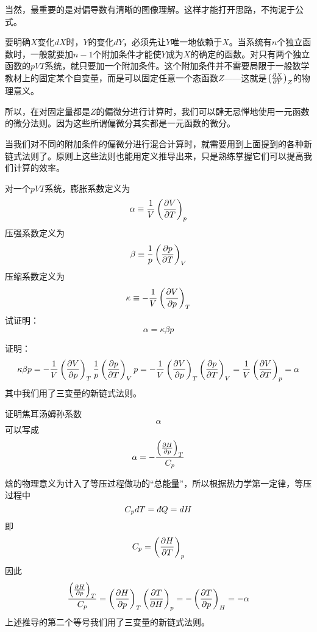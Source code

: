 \documentclass[CJK]{beamer}
\begin{document}
\begin{frame}
  \bch
  当然，最重要的是对偏导数有清晰的图像理解。这样才能打开思路，不拘泥于公式。

  \skiplines
  
  要明确$X$变化$dX$时，$Y$的变化$dY$，必须先让$Y$唯一地依赖于$X$。当系统有$n$个独立函数时，一般就要加$n-1$个附加条件才能使$Y$成为$X$的确定的函数。对只有两个独立函数的$pVT$系统，就只要加一个附加条件。这个附加条件并不需要局限于一般数学教材上的固定某个自变量，而是可以固定任意一个态函数$Z$——这就是$\left(\frac{\partial X}{\partial Y}\right)_{Z}$的物理意义。

  \skipline
  
  所以，在对固定量都是$Z$的偏微分进行计算时，我们可以肆无忌惮地使用一元函数的微分法则。因为这些所谓偏微分其实都是一元函数的微分。

  \skipline
  当我们对不同的附加条件的偏微分进行混合计算时，就需要用到上面提到的各种新链式法则了。原则上这些法则也能用定义推导出来，只是熟练掌握它们可以提高我们计算的效率。
  
  \ech
\end{frame}


\begin{frame}
  \chtitle{\proid (\sone)}
  \bch
  对一个$pVT$系统，膨胀系数定义为
  $$\alpha \equiv \frac{1}{V}\left(\frac{\partial V}{\partial T}\right)_{p}$$
  压强系数定义为
  $$\beta \equiv \frac{1}{p}\left(\frac{\partial p}{\partial T}\right)_{V}$$
  压缩系数定义为
  $$\kappa \equiv -\frac{1}{V}\left(\frac{\partial V}{\partial p}\right)_{T}$$
  试证明：
  $$\alpha = \kappa \beta p$$
\ech
\end{frame}

\begin{frame}
  \bch
  证明：
  $$\kappa\beta p = -\frac{1}{V}\left(\frac{\partial V}{\partial p}\right)_{T} \frac{1}{p}\left(\frac{\partial p}{\partial T}\right)_{V} p = -\frac{1}{V}\left(\frac{\partial V}{\partial p}\right)_{T} \left(\frac{\partial p}{\partial T}\right)_{V} = \frac{1}{V}\left(\frac{\partial V}{\partial T}\right)_{p} = \alpha$$
  其中我们用了三变量的新链式法则。
  \ech
\end{frame}

\begin{frame}
  \chtitle{\proid (\sone)}
  \bch
  证明焦耳汤姆孙系数$$ \alpha$$可以写成
  $$ \alpha = -\frac{\left(\frac{\partial H}{\partial p}\right)_{T}}{C_p} $$
\ech
\end{frame}

\begin{frame}
  \bch
  焓的物理意义为计入了等压过程做功的“总能量”，所以根据热力学第一定律，等压过程中
  $$C_p dT = \dbar Q = dH$$
  即$$C_p = \left(\frac{\partial H}{\partial T}\right)_{p}$$
  因此
  $$ \frac{\left(\frac{\partial H}{\partial p}\right)_{T}}{C_p} = \left(\frac{\partial H}{\partial p}\right)_{T} \left(\frac{\partial T}{\partial H}\right)_{p} = -\left(\frac{\partial T}{\partial p}\right)_{H}  = -\alpha$$
  上述推导的第二个等号我们用了三变量的新链式法则。
  
\ech
\end{frame}
\end{document}

